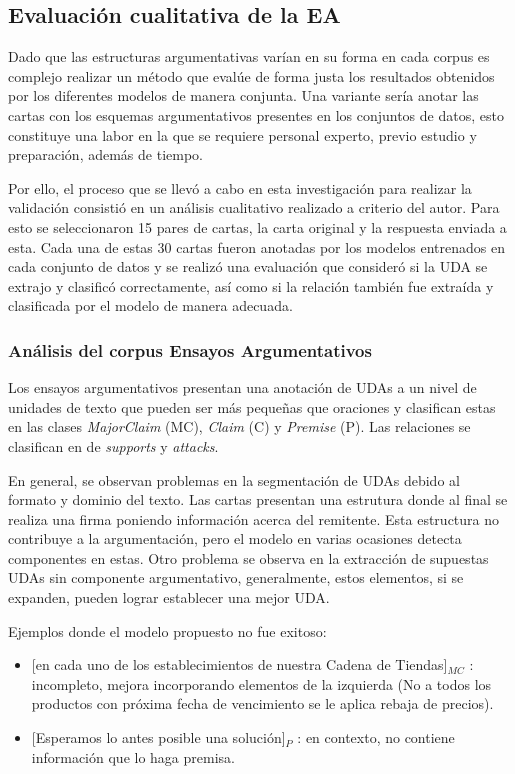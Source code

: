\documentclass{rcci} %
\begin{document}
\subsection*{Evaluaci\'on cualitativa de la EA}

Dado que las estructuras argumentativas var\'ian en su forma en cada corpus es complejo realizar un m\'etodo que eval\'ue de forma 
justa los resultados obtenidos por los diferentes modelos de manera conjunta. Una variante ser\'ia anotar las cartas 
con los esquemas argumentativos presentes en los conjuntos de datos, esto constituye una labor en la que se requiere
personal experto, previo estudio y preparaci\'on, adem\'as de tiempo. 

Por ello, el proceso que se llev\'o a cabo en esta investigaci\'on para realizar la 
validaci\'on consisti\'o en un an\'alisis cualitativo realizado a criterio del autor. Para esto se seleccionaron 15 pares 
de cartas, la carta original y la respuesta enviada a esta. Cada una de estas 30 cartas fueron anotadas por los modelos entrenados en cada 
conjunto de datos y se realiz\'o una evaluaci\'on que consider\'o si la UDA se extrajo y clasific\'o correctamente, 
as\'i como si la relaci\'on tambi\'en fue extra\'ida y clasificada por el modelo de manera adecuada.

\subsubsection*{An\'alisis del corpus Ensayos Argumentativos}

Los ensayos argumentativos presentan una anotaci\'on de UDAs a un nivel de unidades de texto que pueden ser 
m\'as peque\~nas que oraciones y clasifican estas en las clases \textit{MajorClaim} (MC), \textit{Claim} (C) y \textit{Premise}
(P). Las relaciones se clasifican en de \textit{supports} y \textit{attacks}. 

En general, se observan problemas en la segmentaci\'on de UDAs debido al formato y dominio del texto.
Las cartas presentan una estrutura donde al final se realiza una firma poniendo informaci\'on acerca del remitente.
Esta estructura no contribuye a la argumentaci\'on, pero el modelo en varias ocasiones detecta componentes en estas. 
Otro problema se observa en la extracci\'on de supuestas UDAs sin componente argumentativo,
generalmente, estos elementos, si se expanden, pueden lograr establecer una mejor UDA.

Ejemplos donde el modelo propuesto no fue exitoso:
\begin{itemize}
	\item \text{} [en cada uno de los establecimientos de nuestra Cadena de Tiendas]$_{MC}$
	      : incompleto, mejora incorporando elementos de la izquierda (No a todos los productos con pr\'oxima fecha de vencimiento se le aplica rebaja de precios). %
	\item \text{} [Esperamos lo antes posible una soluci\'on]$_{P}$
	      : en contexto, no contiene informaci\'on que lo haga premisa. %
\end{itemize}
\end{document}

